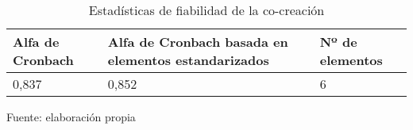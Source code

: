 \begin{table}[h]
    \caption {Estadísticas de fiabilidad de la co-creación}
	\label{tab:fiabilidadCocreacion}
	\setlength\extrarowheight{5pt}
	
	\begin{tabular}{p{5.7cm} p{4.6cm} p{2.8cm}}
	\toprule
	Alfa de Cronbach	& Alfa de Cronbach basada en elementos estandarizados	& Nº de elementos \\
	\midrule
	0,837				& 0,852					& 6 \\
	\bottomrule
	\end{tabular}
	
	\center
	\footnotesize
	Fuente: elaboración propia
\end{table}
